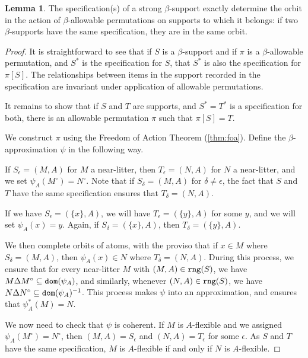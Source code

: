 \documentclass[112pt]{article}
\theoremstyle{definition}
\newtheorem{lemma}[theorem]{Lemma}
\theoremstyle{remark}
\begin{document}
\begin{lemma}\label{lem:specification_determines_orbit}
The specification(s) of a strong $\beta$-support exactly determine the orbit in the action of $\beta$-allowable permutations on supports to which it belongs:  if two $\beta$-supports have the same specification, they are in the same orbit.
\end{lemma}
\begin{proof}
It is straightforward to see that if $S$ is a $\beta$-support and if $\pi$ is a $\beta$-allowable permutation, and $S^*$ is the  specification for $S$, that $S^*$ is also the specification for $\pi[S]$.  The relationships between items in the support recorded in the specification are invariant under application of allowable permutations.

It remains to show that if $S$ and $T$ are supports, and $S^*=T^*$ is a specification for both, there is an allowable permutation $\pi$ such that $\pi[S]=T$.

We construct $\pi$ using the Freedom of Action Theorem {(\ref{thm:foa})}.
Define the $\beta$-approximation $\psi$ in the following way.


If $S_\epsilon = (M,A)$ for $M$ a near-litter, then $T_\epsilon = (N,A)$ for $N$ a near-litter, and we set $\psi_A(M^\circ) = N^\circ$.
Note that if $S_\delta = (M,A)$ for $\delta \neq \epsilon$, the fact that $S$ and
$T$ have the same specification ensures that $T_\delta = (N,A)$.

If we have $S_\epsilon = (\{x\},A)$, we will have $T_\epsilon = (\{y\},A)$ for some $y$, and we will set $\psi_A(x) = y$.
Again, if $S_\delta = (\{x\},A)$, then $T_\delta = (\{y\},A)$.

We then complete orbits of atoms, with the proviso that if $x \in M$ where $S_\delta = (M, A)$, then $\psi_A(x) \in N$ where $T_\delta = (N, A)$.
During this process, we ensure that for every near-litter $M$ with $(M,A) \in {\tt rng}(S)$, we have $M \Delta M^\circ \subseteq {\tt dom}(\psi_A)$, and similarly, whenever $(N,A) \in {\tt rng}(S)$, we have $N \Delta N^\circ \subseteq {\tt dom}(\psi_A)^{-1}$.
This process makes $\psi$ into an approximation, and ensures that $\psi_A^*(M) = N$.

We now need to check that $\psi$ is coherent.
If $M$ is $A$-flexible and we assigned $\psi_A(M^\circ) = N^\circ$, then $(M,A) = S_\epsilon$ and $(N,A) = T_\epsilon$ for some $\epsilon$.
As $S$ and $T$ have the same specification, $M$ is $A$-flexible if and only if $N$ is $A$-flexible.


\end{proof}
\end{document}

